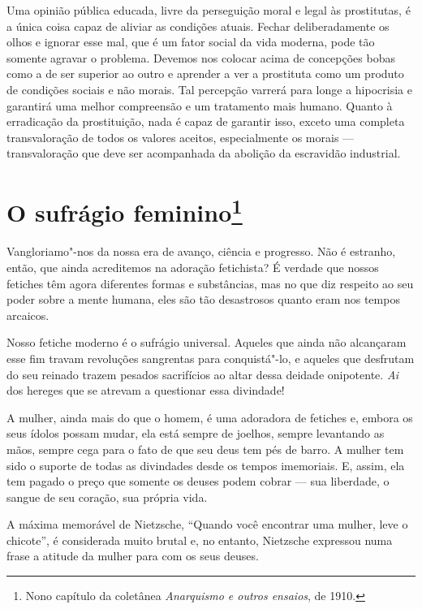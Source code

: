 Uma opinião pública educada, livre da perseguição moral e legal às
prostitutas, é a única coisa capaz de aliviar as condições atuais.
Fechar deliberadamente os olhos e ignorar esse mal, que é um fator
social da vida moderna, pode tão somente agravar o problema. Devemos nos
colocar acima de concepções bobas como a de ser superior ao outro e
aprender a ver a prostituta como um produto de condições sociais e não
morais. Tal percepção varrerá para longe a hipocrisia e garantirá uma
melhor compreensão e um tratamento mais humano. Quanto à erradicação da
prostituição, nada é capaz de garantir isso, exceto uma completa
transvaloração de todos os valores aceitos, especialmente os morais --- transvaloração que deve ser acompanhada da abolição da escravidão
industrial.

\chapter{O sufrágio feminino\footnote{Nono capítulo da coletânea \emph{Anarquismo
  e outros ensaios}, de 1910.}}

Vangloriamo"-nos da nossa era de avanço, ciência e progresso. Não é
estranho, então, que ainda acreditemos na adoração fetichista? É verdade
que nossos fetiches têm agora diferentes formas e substâncias, mas no
que diz respeito ao seu poder sobre a mente humana, eles são tão
desastrosos quanto eram nos tempos arcaicos.

Nosso fetiche moderno é o sufrágio universal. Aqueles que ainda não
alcançaram esse fim travam revoluções sangrentas para conquistá"-lo, e
aqueles que desfrutam do seu reinado trazem pesados ​​sacrifícios ao
altar dessa deidade onipotente. \textit{Ai} dos hereges que se atrevam a
questionar essa divindade!

A mulher, ainda mais do que o homem, é uma adoradora de fetiches e,
embora os seus ídolos possam mudar, ela está sempre de joelhos, sempre
levantando as mãos, sempre cega para o fato de que seu deus tem pés de\label{barro}
barro. A mulher tem sido o suporte de todas as divindades desde os tempos
imemoriais. E, assim, ela tem pagado o preço que somente os deuses podem
cobrar --- sua liberdade, o sangue de seu coração, sua própria vida.

A máxima memorável de Nietzsche, ``Quando você encontrar uma mulher,\label{herege}
leve o chicote'', é considerada muito brutal e, no entanto, Nietzsche
expressou numa frase a atitude da mulher para com os seus deuses.

